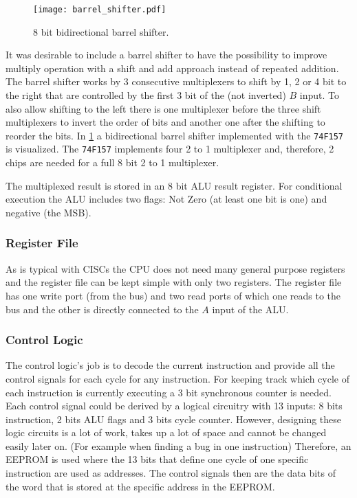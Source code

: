 \begin{figure}[p]
  \centering
  \texttt{[image: barrel\_shifter.pdf]}
  \caption{8 bit bidirectional barrel shifter.}
  \label{fig:barrel_shifter}
\end{figure}
It was desirable to include a barrel shifter to have the possibility to improve multiply operation with a shift and add approach instead of repeated addition.
The barrel shifter works by 3 consecutive multiplexers to shift by 1, 2 or 4 bit to the right that are controlled by the first 3 bit of the (not inverted) $B$ input.
To also allow shifting to the left there is one multiplexer before the three shift multiplexers to invert the order of bits and another one after the shifting to reorder the bits.
In \cref{fig:barrel_shifter} a bidirectional barrel shifter implemented with the \texttt{74F157} is visualized. The \texttt{74F157} implements four 2 to 1 multiplexer and, therefore, 2 chips are needed for a full 8 bit 2 to 1 multiplexer.

The multiplexed result is stored in an 8 bit \gls{ALU} result register.
For conditional execution the \gls{ALU} includes two flags: Not Zero (at least one bit is one) and negative (the \gls{MSB}).

\subsubsection{Register File}
As is typical with \glspl{CISC} the \gls{CPU} does not need many general purpose registers and the register file can be kept simple with only two registers.
The register file has one write port (from the bus) and two read ports of which one reads to the bus and the other is directly connected to the $A$ input of the \gls{ALU}.
\subsubsection{Control Logic}\label{ssec:cl}
The control logic's job is to decode the current instruction and provide all the control signals for each cycle for any instruction.
For keeping track which cycle of each instruction is currently executing a 3 bit synchronous counter is needed.
Each control signal could be derived by a logical circuitry with 13 inputs: 8 bits instruction, 2 bits \gls{ALU} flags and 3 bits cycle counter.
However, designing these logic circuits is a lot of work, takes up a lot of space and cannot be changed easily later on. (For example when finding a bug in one instruction)
Therefore, an \gls{EEPROM} is used where the 13 bits that define one cycle of one specific instruction are used as addresses.
The control signals then are the data bits of the word that is stored at the specific address in the \gls{EEPROM}.

